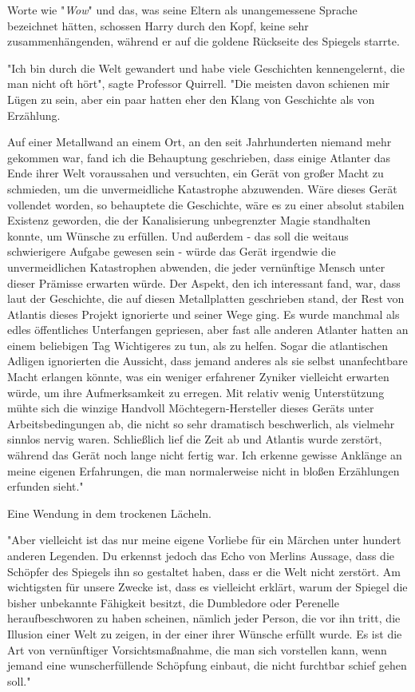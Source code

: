 {Worte wie "\emph{Wow}" und das, was seine Eltern als unangemessene Sprache bezeichnet hätten, schossen Harry durch den Kopf, keine sehr zusammenhängenden, während er auf die goldene Rückseite des Spiegels starrte.

"Ich bin durch die Welt gewandert und habe viele Geschichten kennengelernt, die man nicht oft hört", sagte Professor Quirrell. "Die meisten davon schienen mir Lügen zu sein, aber ein paar hatten eher den Klang von Geschichte als von Erzählung.

Auf einer Metallwand an einem Ort, an den seit Jahrhunderten niemand mehr gekommen war, fand ich die Behauptung geschrieben, dass einige Atlanter das Ende ihrer Welt voraussahen und versuchten, ein Gerät von großer Macht zu schmieden, um die unvermeidliche Katastrophe abzuwenden. Wäre dieses Gerät vollendet worden, so behauptete die Geschichte, wäre es zu einer absolut stabilen Existenz geworden, die der Kanalisierung unbegrenzter Magie standhalten konnte, um Wünsche zu erfüllen. Und außerdem - das soll die weitaus schwierigere Aufgabe gewesen sein - würde das Gerät irgendwie die unvermeidlichen Katastrophen abwenden, die jeder vernünftige Mensch unter dieser Prämisse erwarten würde. Der Aspekt, den ich interessant fand, war, dass laut der Geschichte, die auf diesen Metallplatten geschrieben stand, der Rest von Atlantis dieses Projekt ignorierte und seiner Wege ging. Es wurde manchmal als edles öffentliches Unterfangen gepriesen, aber fast alle anderen Atlanter hatten an einem beliebigen Tag Wichtigeres zu tun, als zu helfen. Sogar die atlantischen Adligen ignorierten die Aussicht, dass jemand anderes als sie selbst unanfechtbare Macht erlangen könnte, was ein weniger erfahrener Zyniker vielleicht erwarten würde, um ihre Aufmerksamkeit zu erregen. Mit relativ wenig Unterstützung mühte sich die winzige Handvoll Möchtegern-Hersteller dieses Geräts unter Arbeitsbedingungen ab, die nicht so sehr dramatisch beschwerlich, als vielmehr sinnlos nervig waren. Schließlich lief die Zeit ab und Atlantis wurde zerstört, während das Gerät noch lange nicht fertig war. Ich erkenne gewisse Anklänge an meine eigenen Erfahrungen, die man normalerweise nicht in bloßen Erzählungen erfunden sieht."

Eine Wendung in dem trockenen Lächeln.

"Aber vielleicht ist das nur meine eigene Vorliebe für ein Märchen unter hundert anderen Legenden. Du erkennst jedoch das Echo von Merlins Aussage, dass die Schöpfer des Spiegels ihn so gestaltet haben, dass er die Welt nicht zerstört. Am wichtigsten für unsere Zwecke ist, dass es vielleicht erklärt, warum der Spiegel die bisher unbekannte Fähigkeit besitzt, die Dumbledore oder Perenelle heraufbeschworen zu haben scheinen, nämlich jeder Person, die vor ihn tritt, die Illusion einer Welt zu zeigen, in der einer ihrer Wünsche erfüllt wurde. Es ist die Art von vernünftiger Vorsichtsmaßnahme, die man sich vorstellen kann, wenn jemand eine wunscherfüllende Schöpfung einbaut, die nicht furchtbar schief gehen soll."

}
